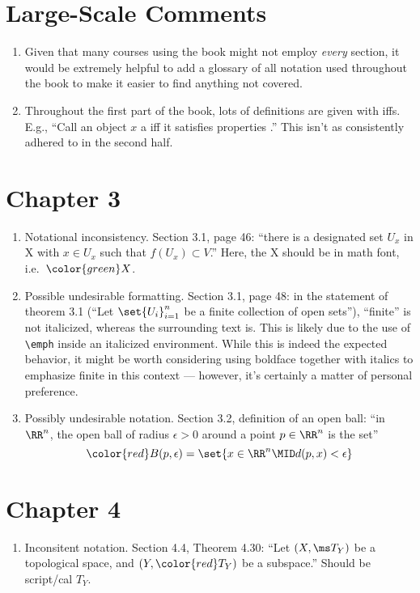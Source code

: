 \documentclass{fkletter}
\begin{document}
\section*{Large-Scale Comments}
\begin{enumerate}
  \item Given that many courses using the book might not employ \emph{every}
    section, it would be extremely helpful to add a glossary of all notation
    used throughout the book to make it easier to find anything not covered.
  \item Throughout the first part of the book, lots of definitions are given
    with iffs. E.g., ``Call an object $x$ a \underline{\phantom{thingy}} iff it
    satisfies properties \underline{\phantom{llist of properties}}.'' This isn't
    as consistently adhered to in the second half.
\end{enumerate}
\section*{Chapter 3}
\begin{enumerate}
  \item Notational inconsistency. Section 3.1, page 46: ``there is a designated
    set $U_x$ in {\color{red} X} with $x \in U_x$ such that $f(U_x) \subset
    V$.'' Here, the {\color{red} X} should be in math font, i.e.\
    ${\color{green} X}$.
  \item Possible undesirable formatting. Section 3.1, page 48: in the statement
    of theorem 3.1 (``Let $\set{U_i}_{i=1}^n$ be a finite collection of open
    sets''), ``finite'' is not italicized, whereas the surrounding text is. This
    is likely due to the use of \verb|\emph| inside an italicized environment.
    {\color{red} While this is indeed the expected behavior, it might be worth
      considering using boldface together with italics to emphasize finite in
      this context --- however, it's certainly a matter of personal preference.}
  \item Possibly undesirable notation. Section 3.2, definition of an open ball:
    ``in $\RR^n$, the open ball of radius $\epsilon > 0$ around a point $p \in
    \RR^n$ is the set''
    \[
      {\color{red}B(p,\epsilon)} = \set{x \in \RR^n \MID d(p,x) < \epsilon}
    \]
\end{enumerate}
\section*{Chapter 4}
\begin{enumerate}
  \item Inconsitent notation. Section 4.4, Theorem 4.30: ``Let $(X,\ms T_Y)$ be
    a topological space, and $(Y, {\color{red} T_Y})$ be a subspace.'' Should be
    script/cal $T_Y$.
\end{enumerate}
\end{document}
